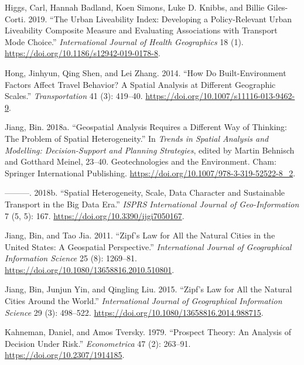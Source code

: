 \documentclass[
  12pt,
]{article}
\newlength{\cslhangindent}
\newlength{\cslentryspacingunit} %
\newenvironment{CSLReferences}[2] %
 {%
  \setlength{\parindent}{0pt}
  \ifodd #1
  \let\oldpar\par
  \def\par{\hangindent=\cslhangindent\oldpar}
  \fi
  \setlength{\parskip}{#2\cslentryspacingunit}
 }%
 {}
\begin{document}
\begin{CSLReferences}{1}{0}
\leavevmode{}%
Higgs, Carl, Hannah Badland, Koen Simons, Luke D. Knibbs, and Billie Giles-Corti. 2019. {``The {Urban Liveability Index}: Developing a Policy-Relevant Urban Liveability Composite Measure and Evaluating Associations with Transport Mode Choice.''} \emph{International Journal of Health Geographics} 18 (1). \url{https://doi.org/10.1186/s12942-019-0178-8}.

\leavevmode{}%
Hong, Jinhyun, Qing Shen, and Lei Zhang. 2014. {``How Do Built-Environment Factors Affect Travel Behavior? {A} Spatial Analysis at Different Geographic Scales.''} \emph{Transportation} 41 (3): 419--40. \url{https://doi.org/10.1007/s11116-013-9462-9}.

\leavevmode{}%
Jiang, Bin. 2018a. {``Geospatial {Analysis Requires} a {Different Way} of {Thinking}: {The Problem} of {Spatial Heterogeneity}.''} In \emph{Trends in {Spatial Analysis} and {Modelling}: {Decision-Support} and {Planning Strategies}}, edited by Martin Behnisch and Gotthard Meinel, 23--40. Geotechnologies and the {Environment}. {Cham}: {Springer International Publishing}. \url{https://doi.org/10.1007/978-3-319-52522-8_2}.

\leavevmode{}%
---------. 2018b. {``Spatial {Heterogeneity}, {Scale}, {Data Character} and {Sustainable Transport} in the {Big Data Era}.''} \emph{ISPRS International Journal of Geo-Information} 7 (5, 5): 167. \url{https://doi.org/10.3390/ijgi7050167}.

\leavevmode{}%
Jiang, Bin, and Tao Jia. 2011. {``Zipf's Law for All the Natural Cities in the {United States}: A Geospatial Perspective.''} \emph{International Journal of Geographical Information Science} 25 (8): 1269--81. \url{https://doi.org/10.1080/13658816.2010.510801}.

\leavevmode{}%
Jiang, Bin, Junjun Yin, and Qingling Liu. 2015. {``Zipf's Law for All the Natural Cities Around the World.''} \emph{International Journal of Geographical Information Science} 29 (3): 498--522. \url{https://doi.org/10.1080/13658816.2014.988715}.

\leavevmode{}%
Kahneman, Daniel, and Amos Tversky. 1979. {``Prospect {Theory}: {An Analysis} of {Decision} Under {Risk}.''} \emph{Econometrica} 47 (2): 263--91. \url{https://doi.org/10.2307/1914185}.


\end{CSLReferences}
\end{document}
